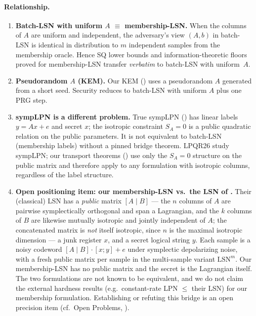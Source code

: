 \documentclass[11pt,a4paper]{article}
\theoremstyle{plain}
\theoremstyle{definition}
\begin{document}
\paragraph{Relationship.}
\begin{enumerate}
\item \textbf{Batch-LSN with uniform $A$ $\equiv$ membership-LSN.} When the columns of $A$ are uniform and independent, the adversary's view $(A,b)$ in batch-LSN is identical in distribution to $m$ independent samples from the membership oracle. Hence SQ lower bounds and information-theoretic floors proved for membership-LSN transfer \emph{verbatim} to batch-LSN with uniform~$A$.
\item \textbf{Pseudorandom $A$ (KEM).} Our KEM () uses a pseudorandom $A$ generated from a short seed. Security reduces to batch-LSN with uniform $A$ plus one PRG step.
\item \textbf{sympLPN is a different problem.} True sympLPN () has linear labels $y = Ax + e$ and secret $x$; the isotropic constraint $S_A = 0$ is a public quadratic relation on the public parameters. It is not equivalent to batch-LSN (membership labels) without a pinned bridge theorem. LPQR26 study sympLPN; our transport theorems () use only the $S_A = 0$ structure on the public matrix and therefore apply to any formulation with isotropic columns, regardless of the label structure.
\item \textbf{Open positioning item: our membership-LSN vs.\ \linebreak[0] the LSN of \cite{KLP+25,LPQR26}.} Their (classical) LSN has a \emph{public} matrix $[A \mid B]$ --- the $n$ columns of $A$ are pairwise symplectically orthogonal and span a Lagrangian, and the $k$ columns of $B$ are likewise mutually isotropic and jointly independent of $A$; the concatenated matrix is \emph{not} itself isotropic, since $n$ is the maximal isotropic dimension --- a junk register $x$, and a secret logical string $y$. Each sample is a noisy codeword $[A \mid B] \cdot [x; y] + e$ under symplectic depolarizing noise, with a fresh public matrix per sample in the multi-sample variant $\mathrm{LSN}^m$. Our membership-LSN has no public matrix and the secret is the Lagrangian itself. The two formulations are not known to be equivalent, and we do not claim the external hardness results (e.g.\ constant-rate LPN $\le$ their LSN) for our membership formulation. Establishing or refuting this bridge is an open precision item (cf.\ Open Problems, ).
\end{enumerate}
\end{document}
